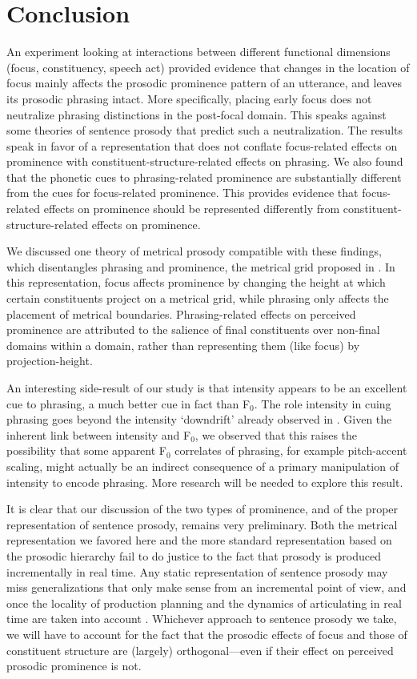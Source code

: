 \documentclass[preprint,review,12pt,authoryear,times]{elsarticle}
\begin{document}
\section{Conclusion}

An experiment looking at interactions between different functional dimensions (focus, constituency, speech act) provided evidence that changes in the location of focus mainly affects the prosodic prominence pattern of an utterance, and leaves its prosodic phrasing intact. More specifically, placing early focus does not neutralize phrasing distinctions in the post-focal domain. This speaks against some theories of sentence prosody that predict such a neutralization. The results speak in favor of a representation that does not conflate focus-related effects on prominence with constituent-structure-related effects on phrasing. We also found that the phonetic cues to phrasing-related prominence are substantially different from the cues for focus-related prominence. This provides evidence that focus-related effects on prominence should be represented differently from constituent-structure-related effects on prominence. 

We discussed one theory of metrical prosody compatible with these findings, which disentangles phrasing and prominence, the metrical grid proposed in \citet{wagner05recursion}. In this representation, focus affects prominence by changing the height at which certain constituents project on a metrical grid, while phrasing only affects the placement of metrical boundaries. Phrasing-related effects on perceived prominence are attributed to the salience of final constituents over non-final domains within a domain, rather than representing them (like focus) by projection-height. 

An interesting side-result of our study is that intensity appears to be an excellent cue to phrasing, a much better cue in fact than F$_0$. The role intensity in cuing phrasing goes beyond the intensity `downdrift' already observed in \citet{pierr79}. Given the inherent link between intensity and F$_0$, we observed that this raises the possibility that some apparent F$_0$ correlates of phrasing, for example pitch-accent scaling, might actually be an indirect consequence of a primary manipulation of intensity to encode phrasing. More research will be needed to explore this result.

It is clear that our discussion of the two types of prominence, and of the proper representation of sentence prosody, remains very preliminary. Both the metrical representation we favored here and the more standard representation based on the prosodic hierarchy fail to do justice to the fact that prosody is produced incrementally in real time. Any static representation of sentence prosody may miss generalizations that only make sense from an incremental point of view, and once the locality of production planning \citep[cf.][]{keati02} and the dynamics of articulating in real time are taken into account \citep[cf.][]{mucke14}. Whichever approach to sentence prosody we take, we will have to account for the fact that the prosodic effects of focus and those of constituent structure are (largely) orthogonal---even if their effect on perceived prosodic prominence is not.
\end{document}

